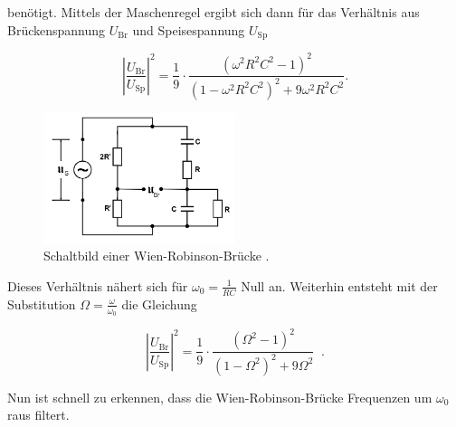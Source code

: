             \noindent benötigt. Mittels der Maschenregel ergibt sich dann für das Verhältnis aus Brückenspannung $U_{\text{Br}}$ 
            und Speisespannung $U_{\text{Sp}}$ 

            \begin{equation*}
                \left|  \frac{U_{\text{Br}}}{U_{\text{Sp}}} \right|^2 = \frac{1}{9} 
                \cdot \frac{\left(\omega^2 R^2 C^2 - 1\right)^2}{\left(1 - \omega^2 R^2 C^2\right)^2 + 9 \omega^2 R^2 C^2} .
            \end{equation*}

            \begin{figure}[ht]
                \centering
                \includegraphics[width=0.5\textwidth]{latex/images/Wien.PNG}
                \caption{Schaltbild einer Wien-Robinson-Brücke \protect \cite{V302}.}
                \label{img:Wien}
            \end{figure}

            \noindent Dieses Verhältnis nähert sich für $\omega_0 = \frac{1}{RC}$ Null an. Weiterhin entsteht mit der 
            Substitution $\Omega = \frac{\omega}{\omega_0}$ die Gleichung

            \begin{equation}
                \left| \frac{U_{\text{Br}}}{U_{\text{Sp}}} \right|^2 = \frac{1}{9} \cdot 
                \frac{\left(\Omega^2 - 1\right)^2}{\left(1 - \Omega^2\right)^2 + 9 \Omega^2} \; \; .
            \end{equation}

            \noindent Nun ist schnell zu erkennen, dass die Wien-Robinson-Brücke Frequenzen um $\omega_0$ raus filtert.







